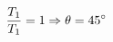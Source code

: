 \documentclass[preview]{standalone}
\begin{document}
\begin{align*}
\special{dvisvgm:raw <g id='unique000'>}\frac{T_1}{T_1} = 1 \Rightarrow \theta = 45^\circ\special{dvisvgm:raw </g>}
\end{align*}
\end{document}
